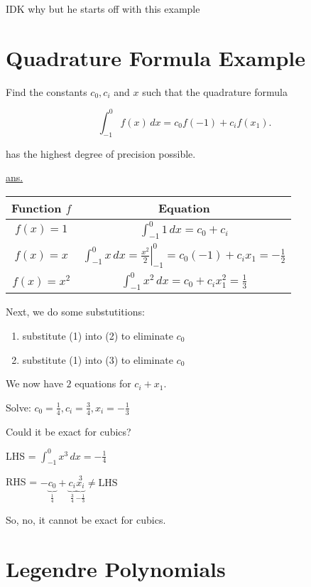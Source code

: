 IDK why but he starts off with this example

\section{Quadrature Formula Example}

Find the constants $c_0, c_i$ and $x$ such that the quadrature formula

\begin{equation*}
  \int_{-1}^{0} f(x) \, dx = c_0 f(-1) + c_i f(x_1)
.\end{equation*}

has the highest degree of precision possible.

\uline{ans.}
 
\renewcommand{\arraystretch}{3}
\begin{center}
  \begin{tabular}{c|c}
    Function $f$ & Equation \\
    \hline
    $f(x) = 1$ & $\displaystyle \int_{-1}^{0} 1 \, dx = c_0 + c_i$ \\
    $f(x) = x$ & $\displaystyle \int_{-1}^{0} x \, dx = \left. \frac{x^2}{2} \right|_{-1}^0 = c_0 (-1) + c_i x_1 = -\frac{1}{2}$ \\
    $f(x) = x^2$ & $\displaystyle \int_{-1}^{0} x^2 \, dx = c_0 + c_i x_1^2 = \frac{1}{3}$ \\
  \end{tabular}
\end{center}

Next, we do some substutitions:

\begin{enumerate}
\item substitute (1) into (2) to eliminate $c_0$
\item substitute (1) into (3) to eliminate $c_0$
\end{enumerate}

We now have $2$ equations for $c_i + x_1$.

Solve: $c_0 = \frac{1}{4}, c_i = \frac{3}{4}, x_i = -\frac{1}{3}$

Could it be exact for cubics?

LHS = $\int_{-1}^{0} x^3 \, dx = -\frac{1}{4}$

RHS = $-\underbrace{c_0}_{\frac{1}{4}} +
\underbrace{c_i}_{\frac{3}{4}}\underbrace{x_i}_{-\frac{1}{3}}^3 \neq \text{LHS} $

So, no, it cannot be exact for cubics.

\section{Legendre Polynomials}

